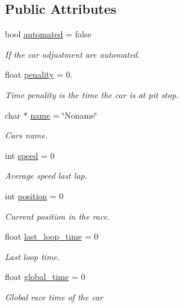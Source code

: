 \subsection*{Public Attributes}
\begin{DoxyCompactItemize}
\item 
bool \hyperlink{class_cars_a9d7a35a79c9151c90cac3a8f25df51fc}{automated} = false
\begin{DoxyCompactList}\small\item\em If the car adjustment are automated. \end{DoxyCompactList}\item 
float \hyperlink{class_cars_a94f7fa28053d92e23aa5ead0b6f46361}{penality} = 0.
\begin{DoxyCompactList}\small\item\em Time penality is the time the car is at pit stop. \end{DoxyCompactList}\item 
char $\ast$ \hyperlink{class_cars_a111cd976930fe6e8771e2d66656dc6b1}{name} = \char`\"{}Noname\char`\"{}
\begin{DoxyCompactList}\small\item\em Car\textquotesingle{}s name. \end{DoxyCompactList}\item 
int \hyperlink{class_cars_a8fb4198d05e96e32197b7a155db11f6d}{speed} = 0
\begin{DoxyCompactList}\small\item\em Average speed last lap. \end{DoxyCompactList}\item 
int \hyperlink{class_cars_aa33805da5fade7a5ed72003db3011445}{position} = 0
\begin{DoxyCompactList}\small\item\em Current position in the race. \end{DoxyCompactList}\item 
float \hyperlink{class_cars_ae635953be902a0d9bc66ca6cb3145b14}{last\+\_\+loop\+\_\+time} = 0
\begin{DoxyCompactList}\small\item\em Last loop time. \end{DoxyCompactList}\item 
float \hyperlink{class_cars_a8265aac52bf5ecbbeffc350ae07a9a2a}{global\+\_\+time} = 0
\begin{DoxyCompactList}\small\item\em Global race time of the car ~\newline

\end{DoxyCompactList}
\end{DoxyCompactItemize}
